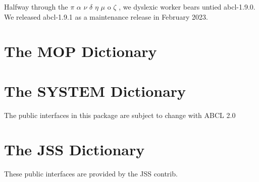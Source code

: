 \documentclass[10pt]{book}
\begin{document}
Halfway through the $\pi$ $\alpha$ $\nu$ $\delta$ $\eta$ $\mu$ o
$\zeta$ \cite{pandemos}, we dyslexic worker bears untied abcl-1.9.0.
We released abcl-1.9.1 as a maintenance release in February 2023.

\appendix 

\chapter{The MOP Dictionary}



\chapter{The SYSTEM Dictionary}

The public interfaces in this package are subject to change with
\textsc{ABCL} 2.0



\chapter{The JSS Dictionary}

These public interfaces are provided by the JSS contrib.






\printindex
\end{document}
